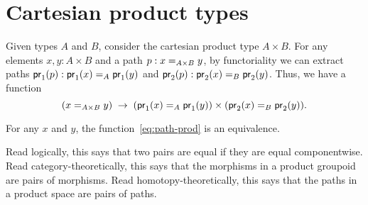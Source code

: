 \section{Cartesian product types}
\label{sec:compute-cartprod}

Given types $A$ and $B$, consider the cartesian product type $A \times B$.  
For any elements $x,y:A\times B$ and a path $p:\id[A\times B]{x}{y}$, by functoriality we can extract paths $\ap{\proj1}p:\id[A]{\proj1(x)}{\proj1(y)}$ and $\ap{\proj2}p:\id[B]{\proj2(x)}{\proj2(y)}$.
Thus, we have a function
\begin{equation}
  (\id[A\times B]{x}{y}) \;\to\; (\id[A]{\proj1(x)}{\proj1(y)}) \times (\id[B]{\proj2(x)}{\proj2(y)}).\label{eq:path-prod}
\end{equation}

\begin{thm}\label{thm:path-prod}
  For any $x$ and $y$, the function~\eqref{eq:path-prod} is an equivalence.
\end{thm}

Read logically, this says that two pairs are equal if they are equal
componentwise.  Read category-theoretically, this says that the
morphisms in a product groupoid are pairs of morphisms.  Read
homotopy-theoretically, this says that the paths in a product
space are pairs of paths.

